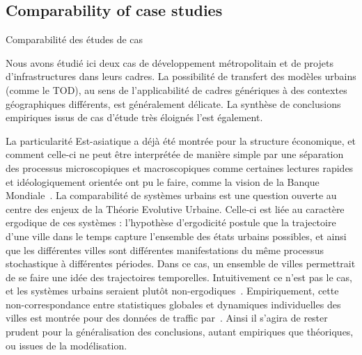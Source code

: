 

\subsection{Comparability of case studies}{Comparabilité des études de cas}


Nous avons étudié ici deux cas de développement métropolitain et de projets d'infrastructures dans leurs cadres. La possibilité de transfert des modèles urbains (comme le TOD), au sens de l'applicabilité de cadres génériques à des contextes géographiques différents, est généralement délicate. La synthèse de conclusions empiriques issus de cas d'étude très éloignés l'est également.


La particularité Est-asiatique a déjà été montrée pour la structure économique, et comment celle-ci ne peut être interprétée de manière simple par une séparation des processus microscopiques et macroscopiques comme certaines lectures rapides et idéologiquement orientée ont pu le faire, comme la vision de la Banque Mondiale~\cite{amsden1994isn}. La comparabilité de systèmes urbains est une question ouverte au centre des enjeux de la Théorie Evolutive Urbaine. Celle-ci est liée au caractère ergodique de ces systèmes : l'hypothèse d'ergodicité postule que la trajectoire d'une ville dans le temps capture l'ensemble des états urbains possibles, et ainsi que les différentes villes sont différentes manifestations du même processus stochastique à différentes périodes. Dans ce cas, un ensemble de villes permettrait de se faire une idée des trajectoires temporelles. Intuitivement ce n'est pas le cas, et les systèmes urbains seraient plutôt non-ergodiques~\cite{pumain2012urban}. Empiriquement, cette non-correspondance entre statistiques globales et dynamiques individuelles des villes est montrée pour des données de traffic par~\cite{2017arXiv171009559D}. Ainsi il s'agira de rester prudent pour la généralisation des conclusions, autant empiriques que théoriques, ou issues de la modélisation.









